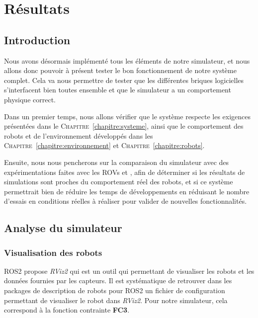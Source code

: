 \chapter{Résultats}
\label{chapter:resultats}
	
	\section{Introduction}

		Nous avons désormais implémenté tous les éléments de notre simulateur, et nous allons donc pouvoir à présent tester le bon fonctionnement de notre système complet. Cela va nous permettre de tester que les différentes briques logicielles s'interfacent bien toutes ensemble et que le simulateur a un comportement physique correct.
		
		Dans un premier temps, nous allons vérifier que le système respecte les exigences présentées dans le \textsc{Chapitre}~\ref{chapitre:systeme}, ainsi que le comportement des robots et de l'environnement développés dans les \textsc{Chapitre}~\ref{chapitre:environnement} et \textsc{Chapitre}~\ref{chapitre:robots}.

		Ensuite, nous nous pencherons sur la comparaison du simulateur avec des expérimentations faites avec les \gls{ROV}s \argos{} et \atoll{}, afin de déterminer si les résultats de simulations sont proches du comportement réel des robots, et si ce système permettrait bien de réduire les temps de développements en réduisant le nombre d'essais en conditions réelles à réaliser pour valider de nouvelles fonctionnalités.

	\section{Analyse du simulateur}

		\subsection{Visualisation des robots}

			\gls{ROS2} propose \textit{RViz2} qui est un outil qui permettant de visualiser les robots et les données fournies par les capteurs. Il est systématique de retrouver dans les packages de description de robots pour \gls{ROS2} un fichier de configuration permettant de visualiser le robot dans \textit{RViz2}. Pour notre simulateur, cela correspond à la fonction contrainte \textbf{FC3}.

